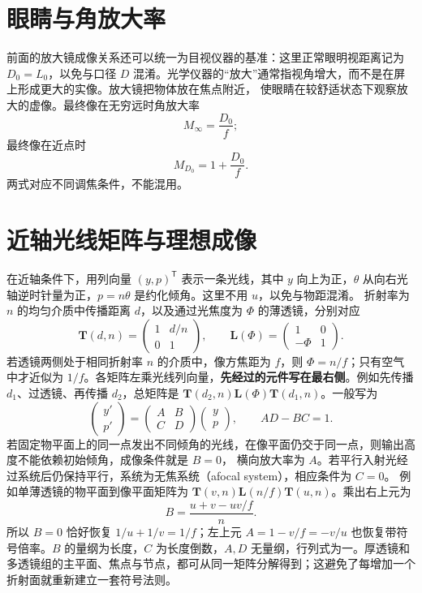 \section{眼睛与角放大率}

前面的放大镜成像关系还可以统一为目视仪器的基准：这里正常眼明视距离记为 $D_0=L_0$，以免与口径 $D$ 混淆。光学仪器的“放大”通常指视角增大，而不是在屏上形成更大的实像。放大镜把物体放在焦点附近，
使眼睛在较舒适状态下观察放大的虚像。最终像在无穷远时角放大率
\begin{equation}
 M_\infty=\frac {D_0}f;
\end{equation}
最终像在近点时
\begin{equation}
 M_{D_0}=1+\frac {D_0}f.
\end{equation}
两式对应不同调焦条件，不能混用。

\section{近轴光线矩阵与理想成像}

在近轴条件下，用列向量 $(y,p)^{\mathsf T}$ 表示一条光线，其中 $y$ 向上为正，$\theta$ 从向右光轴逆时针量为正，$p=n\theta$ 是约化倾角。这里不用 $u$，以免与物距混淆。
折射率为 $n$ 的均匀介质中传播距离 $d$，以及通过光焦度为 $\Phi$ 的薄透镜，分别对应
\begin{equation}
 \mathbf T(d,n)=
 \begin{pmatrix}1&d/n\\0&1\end{pmatrix},
 \qquad
 \mathbf L(\Phi)=
 \begin{pmatrix}1&0\\-\Phi&1\end{pmatrix}.
\end{equation}
若透镜两侧处于相同折射率 $n$ 的介质中，像方焦距为 $f$，则 $\Phi=n/f$；只有空气中才近似为 $1/f$。各矩阵左乘光线列向量，\textbf{先经过的元件写在最右侧}。例如先传播 $d_1$、过透镜、再传播 $d_2$，总矩阵是 $\mathbf T(d_2,n)\mathbf L(\Phi)\mathbf T(d_1,n)$。一般写为
\begin{equation}
 \begin{pmatrix}y'\\p'\end{pmatrix}
 =\begin{pmatrix}A&B\\C&D\end{pmatrix}
 \begin{pmatrix}y\\p\end{pmatrix},
 \qquad AD-BC=1.
\end{equation}
若固定物平面上的同一点发出不同倾角的光线，在像平面仍交于同一点，则输出高度不能依赖初始倾角，成像条件就是 $B=0$，
横向放大率为 $A$。若平行入射光经过系统后仍保持平行，系统为无焦系统（afocal system），相应条件为 $C=0$。
例如单薄透镜的物平面到像平面矩阵为 $\mathbf T(v,n)\mathbf L(n/f)\mathbf T(u,n)$。乘出右上元为
\[
 B=\frac{u+v-uv/f}{n}.
\]
所以 $B=0$ 恰好恢复 $1/u+1/v=1/f$；左上元 $A=1-v/f=-v/u$ 也恢复带符号倍率。$B$ 的量纲为长度，$C$ 为长度倒数，$A,D$ 无量纲，行列式为一。厚透镜和多透镜组的主平面、焦点与节点，都可从同一矩阵分解得到；这避免了每增加一个折射面就重新建立一套符号法则。

